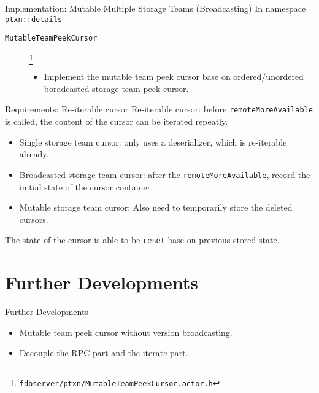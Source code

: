 \documentclass[9pt]{beamer}
\begin{document}
    \begin{frame}{Implementation: Mutable Multiple Storage Teams (Broadcasting)}
        In namespace \texttt{ptxn::details}
        \begin{description}
            \item[\texttt{MutableTeamPeekCursor}]\footnote{\texttt{fdbserver/ptxn/MutableTeamPeekCursor.actor.h}}\hfill\\ 
            \begin{itemize}
                \item Implement the mutable team peek cursor base on ordered/unordered boradcasted storage team peek cursor.
            \end{itemize}
        \end{description}
    \end{frame}
    
    
    \begin{frame}{Requirements: Re-iterable cursor}
        Re-iterable cursor: before \texttt{remoteMoreAvailable} is called, the content of the cursor can be iterated repeatly.
        \begin{itemize}
            \item Single storage team cursor: only uses a deserializer, which is re-iterable already.
            \item Broadcasted storage team cursor: after the \texttt{remoteMoreAvailable}, record the initial state of the cursor container.
            \item Mutable storage team cursor: Also need to temporarily store the deleted cursors.
        \end{itemize}
        
        The state of the cursor is able to be \texttt{reset} base on previous stored state.
    \end{frame}
    
    \section{Further Developments}
    \begin{frame}{Further Developments}
        \begin{itemize}
            \item Mutable team peek cursor without version broadcasting.
            \item Decouple the RPC part and the iterate part.
        \end{itemize}
    \end{frame}
    
    
\end{document}
